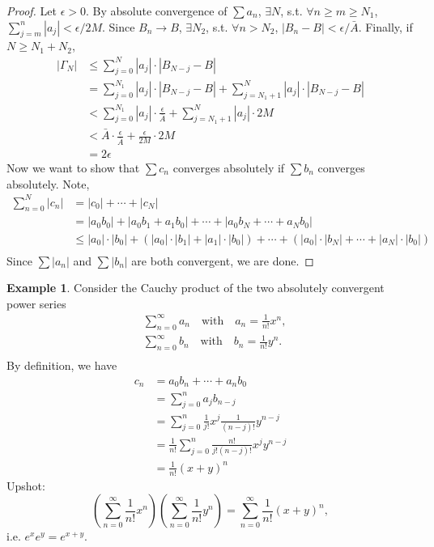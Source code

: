 \documentclass[12pt]{article}
\theoremstyle{plain}
\theoremstyle{definition}
\newtheorem*{eg}{Example}
\begin{document}
\begin{proof}
    Let $\epsilon>0$.
    By absolute convergence of $\sum a_n$, $\exists N$, s.t. $\forall n\geq m\geq N_1$,  $\sum_{j=m}^n
    |a_j|<\epsilon/2M$.
    Since $B_n\rightarrow B$, $\exists N_2$, s.t. $\forall n>N_2$, $|B_n-B|<\epsilon/\bar{A}$.
    Finally, if $N\geq N_1+N_2$,
    $$\begin{aligned}
        |\Gamma_N|&\leq \sum_{j=0}^N |a_j|\cdot |B_{N-j}-B|\\
        &= \sum_{j=0}^{N_1} |a_j|\cdot |B_{N-j}-B| + \sum_{j=N_1+1}^{N} |a_j|\cdot |B_{N-j}-B|\\
        &<\sum_{j=0}^{N_1} |a_j|\cdot\frac{\epsilon}{\bar{A}} + \sum_{j= N_1+1}^N |a_j|\cdot 2M\\
        &<\bar{A}\cdot\frac{\epsilon}{\bar{A}} + \frac{\epsilon}{2M}\cdot 2M\\
        &=2\epsilon
    \end{aligned}$$
    Now we want to show that $\sum c_n$ converges absolutely if $\sum b_n$ converges absolutely.
    Note,
    $$\begin{aligned}
        \sum_{n=0}^N |c_n| &= |c_0|+\cdots+|c_N|\\
        &=|a_0b_0| + |a_0b_1+a_1b_0| + \cdots + |a_0b_N + \cdots + a_Nb_0|\\
        &\leq|a_0|\cdot |b_0| + \left(|a_0|\cdot |b_1|+|a_1|\cdot|b_0|\right)
        + \cdots + \left(|a_0|\cdot|b_N| + \cdots + |a_N|\cdot|b_0|\right)\\
    \end{aligned}$$
    Since $\sum |a_n|$ and $\sum |b_n|$ are both convergent, we are done.
\end{proof}

\begin{eg}
    Consider the Cauchy product of the two absolutely convergent power series
    $$\begin{aligned}
        &\sum_{n=0}^\infty a_n\quad\text{with}\quad a_n=\frac{1}{n!}x^n,\\
        &\sum_{n=0}^\infty b_n\quad\text{with}\quad b_n=\frac{1}{n!}y^n.\\
    \end{aligned}$$
    By definition, we have
    $$\begin{aligned}
        c_n &= a_0b_n+\cdots + a_nb_0 \\
        &= \sum_{j=0}^n a_j b_{n-j}\\
        &= \sum_{j=0}^n \frac{1}{j!}x^j \frac{1}{(n-j)!}y^{n-j}\\
        &= \frac{1}{n!}\sum_{j=0}^n\frac{n!}{j!(n-j)!}x^j y^{n-j}\\
        &= \frac{1}{n!}(x+y)^n
    \end{aligned}$$
    Upshot:
    $$\left( \sum_{n=0}^\infty \frac{1}{n!}x^n\right)
    \left(\sum_{n=0}^\infty \frac{1}{n!} y^n\right)
    =\sum_{n=0}^\infty \frac{1}{n!}(x+y)^n,$$
    i.e. $e^x e^y = e^{x+y}$.
\end{eg}
\end{document}
